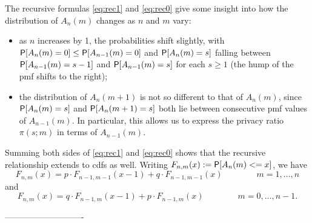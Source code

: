 \documentclass[11pt,draft]{article}
\begin{document}
The recursive formulas \eqref{eq:rec1} and \eqref{eq:rec0} give some insight into how the distribution of $A_n(m)$ changes as $n$ and $m$ vary:
\begin{itemize}
\item  as $n$ increases by 1, the probabilities shift slightly, with $\P[A_n(m) = 0] \leq \P[A_{n-1}(m) = 0]$ and
$\P[A_n(m) = s]$ falling between $\P[A_{n-1}(m) = s-1]$ and $\P[A_{n-1}(m) = s]$ for each $s\geq 1$ (\ie the hump of the pmf shifts to the right);
\item the distribution of $A_n(m+1)$ is not so different to that of $A_n(m)$, since $\P[A_n(m) = s]$ and $\P[A_n(m+1) = s]$ both lie between consecutive pmf values of $A_{n-1}(m)$. In particular, this allows us to express the privacy ratio $\pi(s;m)$ in terms of $A_{n-1}(m)$.
\end{itemize}

Summing both sides of \eqref{eq:rec1} and \eqref{eq:rec0} shows that the recursive relationship extends to cdfs as well.
Writing $F_{n,m}(x) := \P[A_n(m) <= x]$, we have
\begin{equation*}%
F_{n,m}(x) = p\cdot F_{n-1,m-1}(x-1) + q\cdot F_{n-1,m-1}(x)
\qquad\qquad m = 1,\dots,n
\end{equation*}
and 
\begin{equation*}%
F_{n,m}(x) = q\cdot F_{n-1,m}(x-1) + p\cdot F_{n-1,m}(x)
\qquad\qquad m = 0,\dots,n-1.
\end{equation*}



----------------------------
\end{document}
